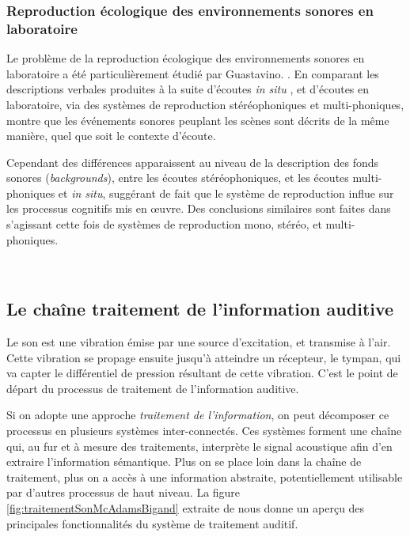 \subsubsection{Reproduction écologique des environnements sonores en laboratoire}

Le problème de la reproduction écologique des environnements sonores en laboratoire a été particulièrement étudié par Guastavino. \citep{guastavino2003approche,guastavino2004perceptual,guastavino2005ecological}. En comparant les descriptions verbales produites à la suite d'écoutes \emph{in situ} , et d'écoutes en laboratoire, via des systèmes de reproduction stéréophoniques et multi-phoniques, \citep{guastavino2005ecological} montre que les événements sonores peuplant les scènes sont décrits de la même manière, quel que soit le contexte d'écoute.

Cependant des différences apparaissent au niveau de la description des fonds sonores (\emph{backgrounds}), entre les écoutes stéréophoniques, et les écoutes multi-phoniques et \emph{in situ}, suggérant de fait que le système de reproduction influe sur les processus cognitifs mis en œuvre. Des conclusions similaires sont faites dans \citep{guastavino2004perceptual} s'agissant cette fois de systèmes de reproduction mono, stéréo, et multi-phoniques.

 \\

\subsection{Le chaîne traitement de l'information auditive}
\label{sec:chaineTaite}

Le son est une vibration émise par une source d'excitation, et transmise à l'air. Cette vibration se propage ensuite jusqu'à atteindre un récepteur, le tympan, qui va capter le différentiel de pression résultant de cette vibration. C'est le point de départ du processus de traitement de l'information auditive. 

Si on adopte une approche \emph{traitement de l'information}, on peut décomposer ce processus en plusieurs systèmes inter-connectés. Ces systèmes forment une chaîne qui, au fur et à mesure des traitements, interprète le signal acoustique afin d'en extraire l'information sémantique. Plus on se place loin dans la chaîne de traitement, plus on a accès à une information abstraite, potentiellement utilisable par d'autres processus de haut niveau. La figure \ref{fig:traitementSonMcAdamsBigand} extraite de \citep{mcadams1994penser} nous donne un aperçu des principales fonctionnalités du système de traitement auditif.

